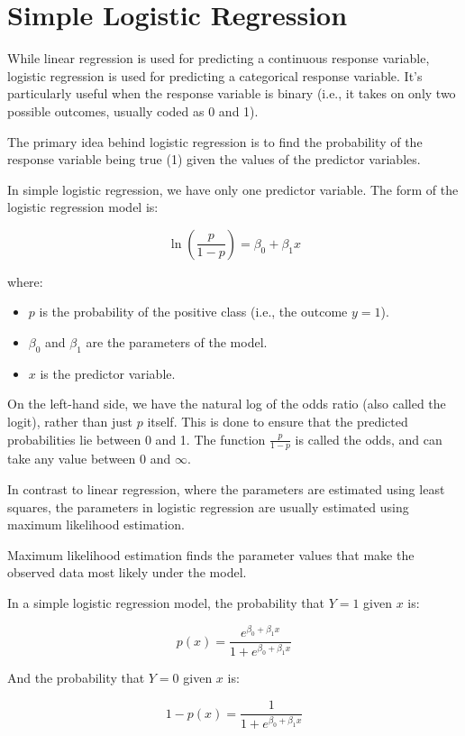 \chapter{Simple Logistic Regression}

While linear regression is used for predicting a continuous response variable, logistic regression is used for predicting a categorical response variable. It's particularly useful when the response variable is binary (i.e., it takes on only two possible outcomes, usually coded as 0 and 1).

The primary idea behind logistic regression is to find the probability of the response variable being true (1) given the values of the predictor variables. 

In simple logistic regression, we have only one predictor variable. The form of the logistic regression model is:

\begin{equation}
\ln\left(\frac{p}{1 - p}\right) = \beta_0 + \beta_1x
\end{equation}

where:
\begin{itemize}
\item $p$ is the probability of the positive class (i.e., the outcome $y = 1$).
\item $\beta_0$ and $\beta_1$ are the parameters of the model.
\item $x$ is the predictor variable.
\end{itemize}

On the left-hand side, we have the natural log of the odds ratio (also called the logit), rather than just $p$ itself. This is done to ensure that the predicted probabilities lie between 0 and 1. The function $\frac{p}{1 - p}$ is called the odds, and can take any value between $0$ and $\infty$. 

In contrast to linear regression, where the parameters are estimated using least squares, the parameters in logistic regression are usually estimated using maximum likelihood estimation. 

Maximum likelihood estimation finds the parameter values that make the observed data most likely under the model. 

In a simple logistic regression model, the probability that $Y = 1$ given $x$ is:

\begin{equation}
p(x) = \frac{e^{\beta_0 + \beta_1x}}{1 + e^{\beta_0 + \beta_1x}}
\end{equation}

And the probability that $Y = 0$ given $x$ is:

\begin{equation}
1 - p(x) = \frac{1}{1 + e^{\beta_0 + \beta_1x}}
\end{equation}

\